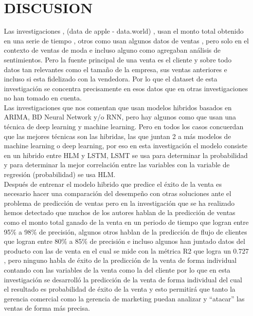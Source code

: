 \documentclass[conference]{IEEEtran}
\begin{document}
\section{DISCUSION}
Las investigaciones \cite{b3}, \cite{b4} (data de apple - data.world) , \cite{b20} usan el monto total obtenido en una serie de tiempo  , otros como \cite{b22} usan algunos datos de ventas , pero solo en el contexto de ventas de moda e incluso alguno como \cite{b24} agregaban análisis de sentimientos. Pero la fuente principal de una venta es el cliente y sobre todo datos tan relevantes como el tamaño de la empresa, sus ventas anteriores e incluso si esta fidelizado con la vendedora. Por lo que el dataset de esta investigación se concentra precisamente en esos datos que en otras investigaciones no han tomado en cuenta.\\
Las investigaciones \cite{b3}\cite{b4} que nos comentan que usan modelos hibridos basados en ARIMA, BD Neural Network y/o RNN, pero hay algunos como \cite{b1}\cite{b2}\cite{b5}\cite{b6}\cite{b7} que usan una técnica de deep learning y machine learning. Pero en todos los casos concuerdan que las mejores técnicas son las hibridas, las que juntan 2 a más modelos de machine learning o deep learning, por eso en esta investigación el modelo consiste en un hibrido entre HLM y LSTM, LSMT se usa para determinar la probabilidad y para determinar la mejor correlación entre las variables con la variable de regresión (probabilidad) se usa HLM.\\
Después de entrenar el modelo hibrido que predice el éxito de la venta es necesario hacer una comparación del desempeño con otras soluciones ante el problema de predicción de ventas pero en la investigación que se ha realizado hemos detectado que muchos de los autores hablan de la predicción de ventas como el monto total ganado de la venta en un periodo de tiempo\cite{b2}\cite{b5}\cite{b6} que logran entre 95\% a 98\% de precisión, algunos otros hablan de la predicción de flujo de clientes\cite{b11}\cite{b12}\cite{b13}\cite{b14} que logran entre 80\% a 85\% de precisión  e incluso algunos han juntado datos del producto\cite{b1} con las de venta  en el cual se mide con la métrica R2 que logra un 0.727 , pero ninguno habla de éxito de la predicción de la venta de forma individual contando con las variables de la venta como la del cliente por lo que en esta investigación se desarrolló la predicción de la venta de forma individual del cual el resultado es probabilidad de éxito de la venta y esto permitirá que tanto la gerencia comercial como la gerencia de marketing puedan analizar y “atacar” las ventas de forma más precisa.\\
\end{document}

